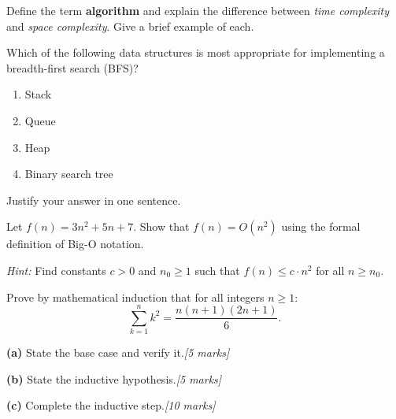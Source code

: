 \documentclass[
    language=english,
    doctype=exam,
    institution=none,
]{../../omnilatex}
\begin{document}
\maketitle

\begin{question}[5]
    Define the term \textbf{algorithm} and explain the difference between
    \textit{time complexity} and \textit{space complexity}.  Give a brief
    example of each.
\end{question}
\begin{answer}[2cm]
\end{answer}

\begin{question}[5]
    Which of the following data structures is most appropriate for implementing
    a breadth-first search (BFS)?
    \begin{enumerate}[label=(\alph*)]
        \item Stack
        \item Queue
        \item Heap
        \item Binary search tree
    \end{enumerate}
    Justify your answer in one sentence.
\end{question}
\begin{answer}[1.5cm]
\end{answer}

\begin{question}[10]
    Let $f(n) = 3n^2 + 5n + 7$.  Show that $f(n) = O(n^2)$ using the
    formal definition of Big-O notation.

    \textit{Hint:} Find constants $c > 0$ and $n_0 \geq 1$ such that
    $f(n) \leq c \cdot n^2$ for all $n \geq n_0$.
\end{question}
\begin{answer}[4cm]
\end{answer}

\begin{question}[20]
    Prove by mathematical induction that for all integers $n \geq 1$:
    \[
        \sum_{k=1}^{n} k^2 = \frac{n(n+1)(2n+1)}{6}.
    \]

    \textbf{(a)} State the base case and verify it.\hfill\textit{[5 marks]}

    \textbf{(b)} State the inductive hypothesis.\hfill\textit{[5 marks]}

    \textbf{(c)} Complete the inductive step.\hfill\textit{[10 marks]}
\end{question}
\begin{answer}[6cm]
\end{answer}
\end{document}
